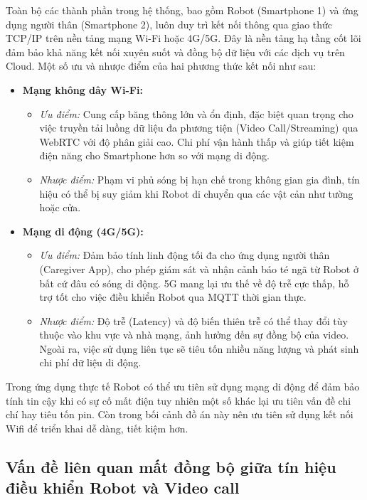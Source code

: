 Toàn bộ các thành phần trong hệ thống, bao gồm Robot (Smartphone 1) và ứng dụng người thân (Smartphone 2), luôn duy trì kết nối thông qua giao thức TCP/IP trên nền tảng mạng Wi-Fi hoặc 4G/5G. Đây là nền tảng hạ tầng cốt lõi đảm bảo khả năng kết nối xuyên suốt và đồng bộ dữ liệu với các dịch vụ trên Cloud. Một số ưu và nhược điểm của hai phương thức kết nối như sau:

\begin{itemize}
    \item \textbf{Mạng không dây Wi-Fi:}
    \begin{itemize}
        \item \textit{Ưu điểm:} Cung cấp băng thông lớn và ổn định, đặc biệt quan trọng cho việc truyền tải luồng dữ liệu đa phương tiện (Video Call/Streaming) qua WebRTC với độ phân giải cao. Chi phí vận hành thấp và giúp tiết kiệm điện năng cho Smartphone hơn so với mạng di động.
        \item \textit{Nhược điểm:} Phạm vi phủ sóng bị hạn chế trong không gian gia đình, tín hiệu có thể bị suy giảm khi Robot di chuyển qua các vật cản như tường hoặc cửa.
    \end{itemize}
    
    \item \textbf{Mạng di động (4G/5G):}
    \begin{itemize}
        \item \textit{Ưu điểm:} Đảm bảo tính linh động tối đa cho ứng dụng người thân (Caregiver App), cho phép giám sát và nhận cảnh báo té ngã từ Robot ở bất cứ đâu có sóng di động. 5G mang lại ưu thế về độ trễ cực thấp, hỗ trợ tốt cho việc điều khiển Robot qua MQTT thời gian thực.
        \item \textit{Nhược điểm:} Độ trễ (Latency) và độ biến thiên trễ có thể thay đổi tùy thuộc vào khu vực và nhà mạng, ảnh hưởng đến sự đồng bộ của video. Ngoài ra, việc sử dụng liên tục sẽ tiêu tốn nhiều năng lượng và phát sinh chi phí dữ liệu di động.
    \end{itemize}
\end{itemize}

Trong ứng dụng thực tế Robot có thể ưu tiên sử dụng mạng di động để đảm bảo tính tin cậy khi có sự cố mất điện tuy nhiên một số khác lại ưu tiên vấn đề chi chí hay tiêu tốn pin. Còn trong bối cảnh đồ án này nên ưu tiên sử dụng kết nối Wifi để triển khai dễ dàng, tiết kiệm hơn.

\subsection{Vấn đề liên quan mất đồng bộ giữa tín hiệu điều khiển Robot và Video call}

